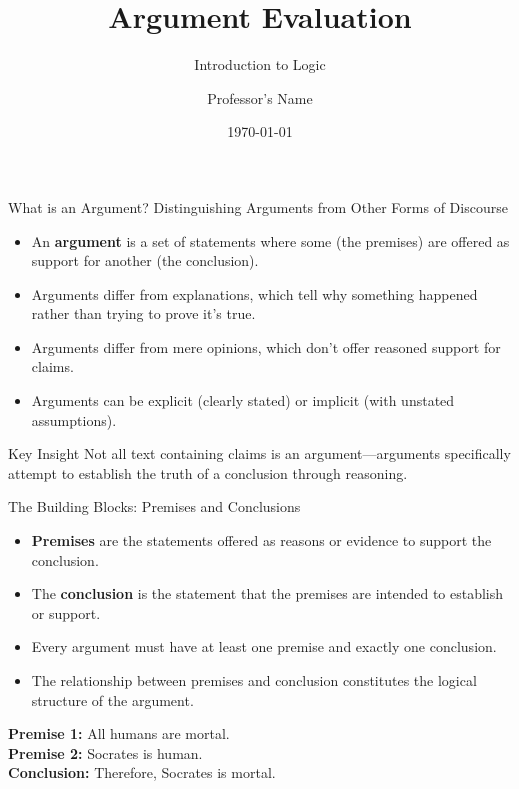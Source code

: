 \documentclass{beamer}
\title{Argument Evaluation}
\subtitle{Introduction to Logic}
\author{Professor's Name}
\date{\today}
\begin{document}
\begin{frame}
    \titlepage
\end{frame}

\begin{frame}{What is an Argument? Distinguishing Arguments from Other Forms of Discourse}
    \begin{itemize}
        \item An \textbf{argument} is a set of statements where some (the premises) are offered as support for another (the conclusion).
        \item Arguments differ from explanations, which tell why something happened rather than trying to prove it's true.
        \item Arguments differ from mere opinions, which don't offer reasoned support for claims.
        \item Arguments can be explicit (clearly stated) or implicit (with unstated assumptions).
    \end{itemize}
    
    \begin{alertblock}{Key Insight}
        Not all text containing claims is an argument—arguments specifically attempt to establish the truth of a conclusion through reasoning.
    \end{alertblock}
\end{frame}

\begin{frame}{The Building Blocks: Premises and Conclusions}
    \begin{itemize}
        \item \textbf{Premises} are the statements offered as reasons or evidence to support the conclusion.
        \item The \textbf{conclusion} is the statement that the premises are intended to establish or support.
        \item Every argument must have at least one premise and exactly one conclusion.
        \item The relationship between premises and conclusion constitutes the logical structure of the argument.
    \end{itemize}
    
    \begin{example}
        \textbf{Premise 1:} All humans are mortal.\\
        \textbf{Premise 2:} Socrates is human.\\
        \textbf{Conclusion:} Therefore, Socrates is mortal.
    \end{example}
\end{frame}
\end{document}
